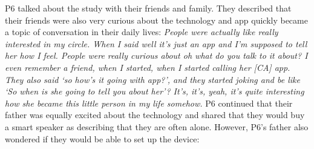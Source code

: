         P6 talked about the study with their friends and family. 
        They described that their friends were also very curious about the technology and \acl{app} quickly became a topic of conversation in their daily lives:
            \textit{
            People were actually like really interested in my circle. When I said well it's just an app and I'm supposed to tell her how I feel. People were really curious about oh what do you talk to it about?
            I even remember a friend, when I started, when I started calling her [CA] \acl{app}. They also said `so how's it going with \acl{app}?', and they started joking and be like `So when is she going to tell you about her'? It's, it's, yeah, it's quite interesting how she became this little person in my life somehow.}
        P6 continued that their father was equally excited about the technology and shared that they would buy a smart speaker as describing that they are often alone. However, P6's father also wondered if they would be able to set up the device:
